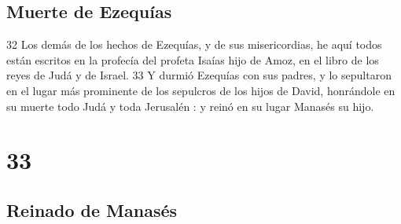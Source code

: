 \section*{Muerte de Ezequías }

 
32 Los demás de los hechos de Ezequías, y de sus misericordias, he aquí todos están escritos en la profecía del profeta Isaías hijo de Amoz, en el libro de los reyes de Judá y de Israel.
33 Y durmió Ezequías con sus padres, y lo sepultaron en el lugar más prominente de los sepulcros de los hijos de David, honrándole en su muerte todo Judá y toda Jerusalén : y reinó en su lugar Manasés su hijo.

\chapter{33}

\section*{Reinado de Manasés }

 

